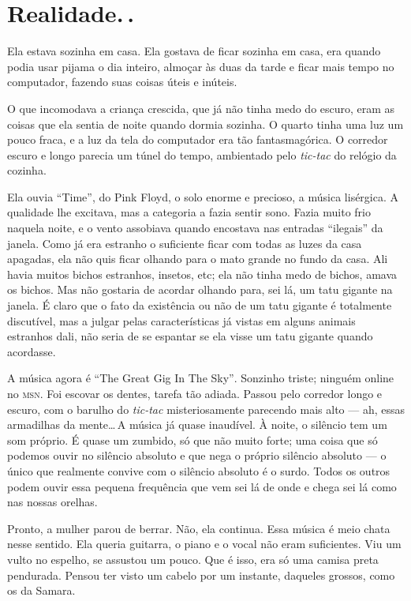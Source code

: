 \chapter{Realidade.\,.}

Ela estava sozinha em casa. Ela gostava de ficar sozinha em casa, era quando podia usar pijama o dia inteiro, almoçar às duas da tarde e ficar mais tempo no computador, fazendo suas coisas úteis e inúteis.

O que incomodava a criança crescida, que já não tinha medo do escuro, eram as coisas que ela sentia de noite quando dormia sozinha. O quarto tinha uma luz um pouco fraca, e a luz da tela do computador era tão fantasmagórica. O corredor escuro e longo parecia um túnel do tempo, ambientado pelo \emph{tic-tac} do relógio da cozinha.

Ela ouvia ``Time'', do Pink Floyd, o solo enorme e precioso, a música lisérgica. A qualidade lhe excitava, mas a categoria a fazia sentir sono. Fazia muito frio naquela noite, e o vento assobiava quando encostava nas entradas ``ilegais'' da janela. Como já era estranho o suficiente ficar com todas as luzes da casa apagadas, ela não quis ficar olhando para o mato grande no fundo da casa. Ali havia muitos bichos estranhos, insetos, etc; ela não tinha medo de bichos, amava os bichos. Mas não gostaria de acordar olhando para, sei lá, um tatu gigante na janela. É claro que o fato da existência ou não de um tatu gigante é totalmente discutível, mas a julgar pelas características já vistas em alguns animais estranhos dali, não seria de se espantar se ela visse um tatu gigante quando acordasse.

A música agora é \foreignlanguage{english}{``The Great Gig In The Sky''}. Sonzinho triste; ninguém online no \textsc{msn}. Foi escovar os dentes, tarefa tão adiada. Passou pelo corredor longo e escuro, com o barulho do \emph{tic-tac} misteriosamente parecendo mais alto --- ah, essas armadilhas da mente\ldots\,A música já quase inaudível. À noite, o silêncio tem um som próprio. É quase um zumbido, só que não muito forte; uma coisa que só podemos ouvir no silêncio absoluto e que nega o próprio silêncio absoluto --- o único que realmente convive com o silêncio absoluto é o surdo. Todos os outros podem ouvir essa pequena frequência que vem sei lá de onde e chega sei lá como nas nossas orelhas.

Pronto, a mulher parou de berrar. Não, ela continua. Essa música é meio chata nesse sentido. Ela queria guitarra, o piano e o vocal não eram suficientes. Viu um vulto no espelho, se assustou um pouco. Que é isso, era só uma camisa preta pendurada. Pensou ter visto um cabelo por um instante, daqueles grossos, como os da Samara.

